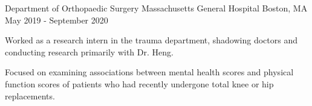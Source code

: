 \begin{cventries}
  \cventry
  {Department of Orthopaedic Surgery} %
  {Massachusetts General Hospital} %
  {Boston, MA} %
  {May 2019 - September 2020} %
  {
    \begin{cvitems} %
    \item {Worked as a research intern in the trauma department, shadowing
      doctors and conducting research primarily with Dr. Heng.}
    \item {Focused on examining associations between mental health scores and
        physical function scores of patients who had recently undergone total
      knee or hip replacements.}
    \end{cvitems}
  }

\end{cventries}
